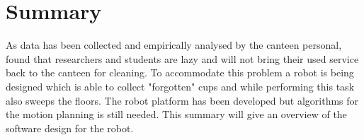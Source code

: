 \chapter{Summary}\label{chap:summary}
As data has been collected and empirically analysed by the canteen personal, found that researchers and students are lazy and will not bring their used service back to the canteen for cleaning. To accommodate this problem a robot is being designed which is able to collect "forgotten" cups and while performing this task also sweeps the floors. The robot platform has been developed but algorithms for the motion planning is still needed. This summary will give an overview of the software design for the robot.